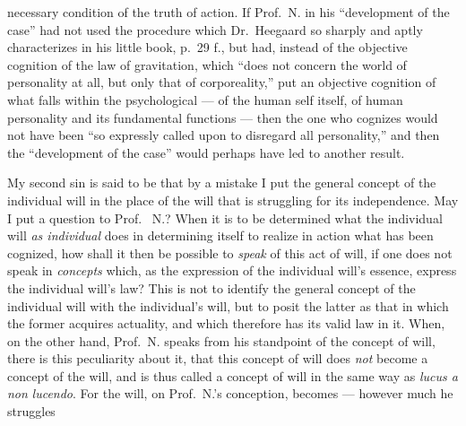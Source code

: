 \documentclass[12pt,a4paper]{book}
\begin{document}
necessary condition of the truth of action. If Prof.\ N. in his ``development
of the case'' had not used the procedure which Dr.\ Heegaard so sharply and
aptly characterizes in his little book, p.\ 29 f., but had, instead of the
objective cognition of the law of gravitation, which ``does not concern the
world of personality at all, but only that of corporeality,'' put an objective
cognition of what falls within the psychological --- of the human self itself,
of human personality and its fundamental functions --- then the one who
cognizes would not have been ``so expressly called upon to disregard all
personality,'' and then the ``development of the case'' would perhaps have led
to another result.

My second sin is said to be that by a mistake I put the general concept of the
individual will in the place of the will that is struggling for its
independence. May I put a question to Prof.\
N.? When it is to be determined what the individual will \emph{as individual}
does in determining itself to realize in action what has been cognized, how
shall it then be possible to \emph{speak} of this act of will, if one does not
speak in \emph{concepts} which, as the expression of the individual will's
essence, express the individual will's law?
This is not to identify the general concept of the individual will with the
individual's will, but to posit the latter as that in which the former acquires
actuality, and which therefore has its valid law in it. When, on the other
hand, Prof.\ N. speaks from his standpoint of the concept of will, there is
this peculiarity about it, that this concept of will does \emph{not} become a
concept of the will, and is thus called a concept of will in the same way as
\textit{lucus a} \emph{\textit{non}} \textit{lucendo}.
For the will, on Prof.\ N.'s conception, becomes --- however much he struggles
\end{document}
